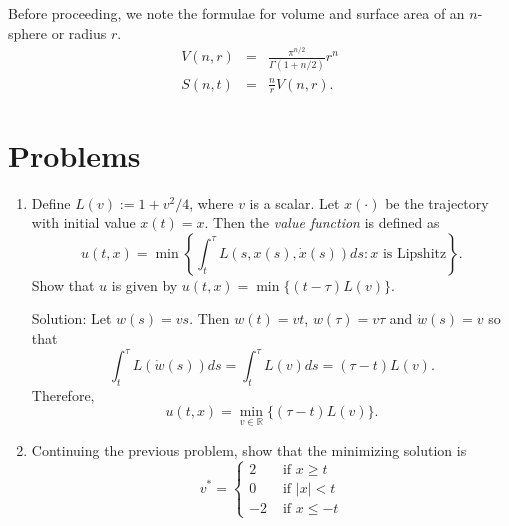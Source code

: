 \documentclass{article}
\theoremstyle{plain}
\numberwithin{thm}{section}
\theoremstyle{plain}
\numberwithin{prop}{section}
\theoremstyle{definition}
\numberwithin{defn}{section}
\theoremstyle{remark}
\numberwithin{equation}{section}
\begin{document}
Before proceeding, we note the formulae for volume and surface area of an $n$-sphere or radius $r$.
\begin{eqnarray}
V(n, r) &=& \frac{\pi^{n/2}}{\Gamma(1 + n/2)}r^n \label{s16e10} \\
S(n, t) &=& \frac{n}{r}V(n, r). \label{s16e11}
\end{eqnarray}

\section{Problems}\label{s17}
\begin{enumerate}
\item Define $L(v) := 1 + v^2/4$, where $v$ is a scalar. Let $x(\cdot)$ be the trajectory with
initial value $x(t) = x$. Then the \emph{value function} is defined as 
\begin{equation}\label{s17e1}
u(t, x) = \min\left\{\int_t^\tau L(s, x(s), \dot{x}(s))ds : x \text{ is Lipshitz}\right\}.
\end{equation}
Show that $u$ is given by $u(t, x) = \min\{(t - \tau)L(v)\}$.

\noindent Solution: Let $w(s) = vs$. Then $w(t) = vt$, $w(\tau) = v\tau$ and $\dot{w}(s) = v$ so
that
\[
\int_t^\tau L(\dot{w}(s))ds = \int_t^\tau L(v)ds = (\tau - t)L(v).
\]
Therefore, 
\begin{equation}\label{s17e2}
u(t, x) = \min_{v \in \mathbb{R}}\{(\tau - t)L(v)\}.
\end{equation}

\item Continuing the previous problem, show that the minimizing solution is 
\[
v^\ast = \begin{cases}
2 & \text{ if } x \ge t \\
0 & \text{ if } |x| < t \\
-2 & \text{ if } x \le -t
\end{cases}
\]


\end{enumerate}
\end{document}
